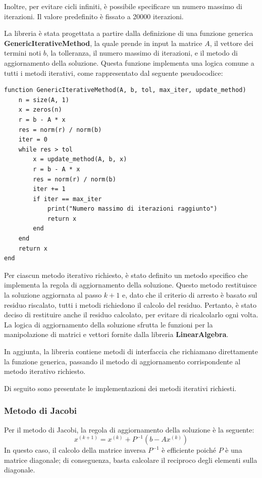 Inoltre, per evitare cicli infiniti, è possibile specificare un numero massimo
di iterazioni. Il valore predefinito è fissato a 20000 iterazioni.

La libreria è stata progettata a partire dalla definizione di una funzione generica
\textbf{GenericIterativeMethod}, la quale prende in input la matrice $A$, il
vettore dei termini noti $b$, la tolleranza, il numero massimo di iterazioni, e
il metodo di aggiornamento della soluzione. Questa funzione implementa una logica
comune a tutti i metodi iterativi, come rappresentato dal seguente pseudocodice:
\begin{verbatim}
function GenericIterativeMethod(A, b, tol, max_iter, update_method)
    n = size(A, 1)
    x = zeros(n)
    r = b - A * x
    res = norm(r) / norm(b)
    iter = 0
    while res > tol
        x = update_method(A, b, x)
        r = b - A * x
        res = norm(r) / norm(b)
        iter += 1
        if iter == max_iter
            print("Numero massimo di iterazioni raggiunto")
            return x
        end
    end
    return x
end
\end{verbatim}

Per ciascun metodo iterativo richiesto, è stato definito un metodo specifico che
implementa la regola di aggiornamento della soluzione. Questo metodo restituisce
la soluzione aggiornata al passo $k+1$ e, dato che il criterio di arresto è basato
sul residuo riscalato, tutti i metodi richiedono il calcolo del residuo. Pertanto,
è stato deciso di restituire anche il residuo calcolato, per evitare di ricalcolarlo
ogni volta. La logica di aggiornamento della soluzione sfrutta le funzioni per
la manipolazione di matrici e vettori fornite dalla libreria \textbf{LinearAlgebra}.

In aggiunta, la libreria contiene metodi di interfaccia che richiamano direttamente
la funzione generica, passando il metodo di aggiornamento corrispondente al metodo
iterativo richiesto.

Di seguito sono presentate le implementazioni dei metodi iterativi richiesti.

\subsubsection{Metodo di Jacobi}
Per il metodo di Jacobi, la regola di aggiornamento della soluzione è la seguente:
\begin{equation}
    x^{(k+1)} = x^{(k)} + P^{-1}(b - Ax^{(k)})
\end{equation}
In questo caso, il calcolo della matrice inversa $P^{-1}$ è efficiente poiché $P$
è una matrice diagonale; di conseguenza, basta calcolare il reciproco degli
elementi sulla diagonale.

